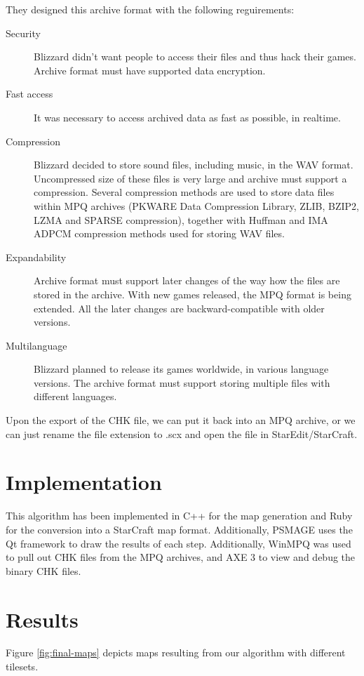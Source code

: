 \documentclass[letterpaper]{article}
\begin{document}
They designed this archive format with the following reguirements:
\begin{description}
	\item[Security] Blizzard didn't want people to access their files and thus hack their games. Archive format must have supported data encryption.
	\item[Fast access] It was necessary to access archived data as fast as possible, in realtime.
	\item[Compression] Blizzard decided to store sound files, including music, in the WAV format. Uncompressed size of these files is very large and archive must support a compression. Several compression methods are used to store data files within MPQ archives (PKWARE Data Compression Library, ZLIB, BZIP2, LZMA and SPARSE compression), together with Huffman and IMA ADPCM compression methods used for storing WAV files.
	\item[Expandability] Archive format must support later changes of the way how the files are stored in the archive. With new games released, the MPQ format is being extended. All the later changes are backward-compatible with older versions.
	\item[Multilanguage] Blizzard planned to release its games worldwide, in various language versions. The archive format must support storing multiple files with different languages.
\end{description}

Upon the export of the CHK file, we can put it back into an MPQ archive, or we can just rename the file extension to .scx and open the file in StarEdit/StarCraft.



\section{Implementation} %
\label{sec:implementation}
This algorithm has been implemented in C++ for the map generation and Ruby for the conversion into a StarCraft map format. Additionally, PSMAGE uses the Qt framework to draw the results of each step. Additionally, WinMPQ was used to pull out CHK files from the MPQ archives, and AXE 3 to view and debug the binary CHK files.


\section{Results} %
\label{sec:results}
Figure \ref{fig:final-maps} depicts maps resulting from our algorithm with different tilesets.
\end{document}
